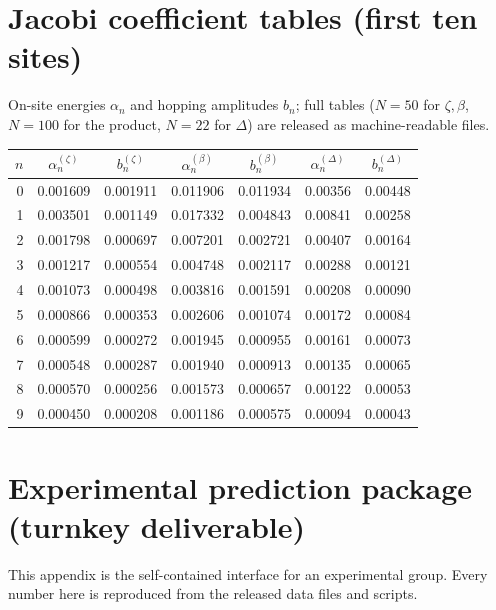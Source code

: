 \documentclass[aps,prx,reprint,floatfix]{revtex4-2}
\begin{document}
\section{Jacobi coefficient tables (first ten sites)}
\label{app:coeffs}
On-site energies $\alpha_n$ and hopping amplitudes $b_n$; full tables
($N=50$ for $\zeta,\beta$, $N=100$ for the product, $N=22$ for $\Delta$)
are released as machine-readable files.

\begin{center}\footnotesize
\begin{tabular}{r|cc|cc|cc}
\toprule
$n$ & $\alpha_n^{(\zeta)}$ & $b_n^{(\zeta)}$
    & $\alpha_n^{(\beta)}$ & $b_n^{(\beta)}$
    & $\alpha_n^{(\Delta)}$ & $b_n^{(\Delta)}$\\
\midrule
0 & 0.001609 & 0.001911 & 0.011906 & 0.011934 & 0.00356 & 0.00448\\
1 & 0.003501 & 0.001149 & 0.017332 & 0.004843 & 0.00841 & 0.00258\\
2 & 0.001798 & 0.000697 & 0.007201 & 0.002721 & 0.00407 & 0.00164\\
3 & 0.001217 & 0.000554 & 0.004748 & 0.002117 & 0.00288 & 0.00121\\
4 & 0.001073 & 0.000498 & 0.003816 & 0.001591 & 0.00208 & 0.00090\\
5 & 0.000866 & 0.000353 & 0.002606 & 0.001074 & 0.00172 & 0.00084\\
6 & 0.000599 & 0.000272 & 0.001945 & 0.000955 & 0.00161 & 0.00073\\
7 & 0.000548 & 0.000287 & 0.001940 & 0.000913 & 0.00135 & 0.00065\\
8 & 0.000570 & 0.000256 & 0.001573 & 0.000657 & 0.00122 & 0.00053\\
9 & 0.000450 & 0.000208 & 0.001186 & 0.000575 & 0.00094 & 0.00043\\
\bottomrule
\end{tabular}
\end{center}

\section{Experimental prediction package (turnkey deliverable)}
\label{app:protocol}

This appendix is the self-contained interface for an experimental group.
Every number here is reproduced from the released data files and scripts.
\end{document}
